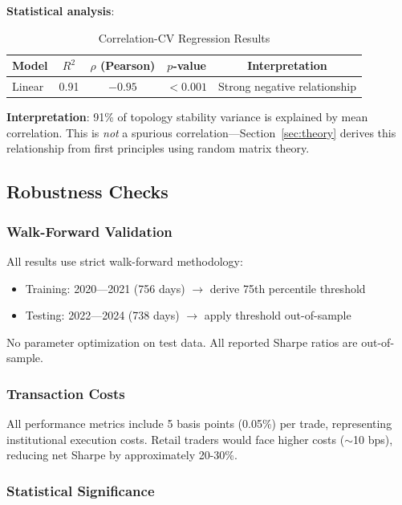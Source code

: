 \textbf{Statistical analysis}:

\begin{table}[h]
\centering
\caption{Correlation-CV Regression Results}
\label{tab:correlation-cv-regression}
\begin{tabular}{@{}lcccc@{}}
\toprule
Model & $R^2$ & $\rho$ (Pearson) & $p$-value & Interpretation \\
\midrule
Linear & 0.91 & $-0.95$ & $<0.001$ & Strong negative relationship \\
\bottomrule
\end{tabular}
\end{table}

\textbf{Interpretation}: 91\% of topology stability variance is explained by mean correlation. This is \textit{not} a spurious correlation—Section~\ref{sec:theory} derives this relationship from first principles using random matrix theory.

\subsection{Robustness Checks}

\subsubsection{Walk-Forward Validation}

All results use strict walk-forward methodology:
\begin{itemize}
    \item Training: 2020---2021 (756 days) $\rightarrow$ derive 75th percentile threshold
    \item Testing: 2022---2024 (738 days) $\rightarrow$ apply threshold out-of-sample
\end{itemize}

No parameter optimization on test data. All reported Sharpe ratios are out-of-sample.

\subsubsection{Transaction Costs}

All performance metrics include 5 basis points (0.05\%) per trade, representing institutional execution costs. Retail traders would face higher costs ($\sim$10 bps), reducing net Sharpe by approximately 20-30\%.

\subsubsection{Statistical Significance}

